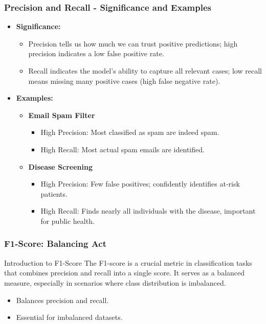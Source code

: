 \documentclass[aspectratio=169]{beamer}
\begin{document}
\begin{frame}[fragile]
    \frametitle{Precision and Recall - Significance and Examples}
    \begin{itemize}
        \item \textbf{Significance:}
        \begin{itemize}
            \item Precision tells us how much we can trust positive predictions; high precision indicates a low false positive rate.
            \item Recall indicates the model's ability to capture all relevant cases; low recall means missing many positive cases (high false negative rate).
        \end{itemize}

        \item \textbf{Examples:}
        \begin{itemize}
            \item \textbf{Email Spam Filter}
            \begin{itemize}
                \item High Precision: Most classified as spam are indeed spam.
                \item High Recall: Most actual spam emails are identified.
            \end{itemize}
            \item \textbf{Disease Screening}
            \begin{itemize}
                \item High Precision: Few false positives; confidently identifies at-risk patients.
                \item High Recall: Finds nearly all individuals with the disease, important for public health.
            \end{itemize}
        \end{itemize}
    \end{itemize}
\end{frame}

\begin{frame}[fragile]
    \frametitle{F1-Score: Balancing Act}
    
    \begin{block}{Introduction to F1-Score}
        The F1-score is a crucial metric in classification tasks that combines precision and recall into a single score. It serves as a balanced measure, especially in scenarios where class distribution is imbalanced. 
    \end{block}

    \begin{itemize}
        \item Balances precision and recall.
        \item Essential for imbalanced datasets.
    \end{itemize}
\end{frame}
\end{document}
